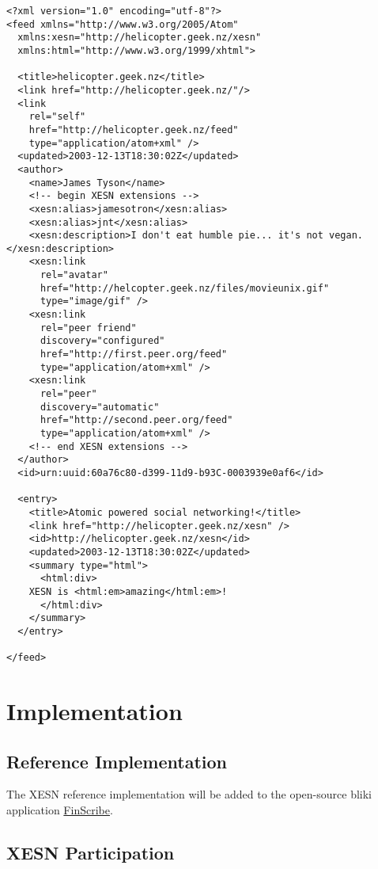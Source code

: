 \documentclass[titlepage,english,a4paper,twoside,dvips]{article}
\begin{document}
\begin{verbatim}
<?xml version="1.0" encoding="utf-8"?>
<feed xmlns="http://www.w3.org/2005/Atom" 
  xmlns:xesn="http://helicopter.geek.nz/xesn"
  xmlns:html="http://www.w3.org/1999/xhtml">

  <title>helicopter.geek.nz</title>
  <link href="http://helicopter.geek.nz/"/>
  <link 
    rel="self" 
    href="http://helicopter.geek.nz/feed" 
    type="application/atom+xml" />
  <updated>2003-12-13T18:30:02Z</updated>
  <author>
    <name>James Tyson</name>
    <!-- begin XESN extensions -->
    <xesn:alias>jamesotron</xesn:alias>
    <xesn:alias>jnt</xesn:alias>
    <xesn:description>I don't eat humble pie... it's not vegan.</xesn:description>
    <xesn:link
      rel="avatar"
      href="http://helcopter.geek.nz/files/movieunix.gif"
      type="image/gif" />
    <xesn:link 
      rel="peer friend"
      discovery="configured"
      href="http://first.peer.org/feed" 
      type="application/atom+xml" />
    <xesn:link 
      rel="peer"
      discovery="automatic"
      href="http://second.peer.org/feed" 
      type="application/atom+xml" />
    <!-- end XESN extensions -->
  </author>
  <id>urn:uuid:60a76c80-d399-11d9-b93C-0003939e0af6</id>

  <entry>
    <title>Atomic powered social networking!</title>
    <link href="http://helicopter.geek.nz/xesn" />
    <id>http://helicopter.geek.nz/xesn</id>
    <updated>2003-12-13T18:30:02Z</updated>
    <summary type="html">
      <html:div>
	XESN is <html:em>amazing</html:em>!
      </html:div>
    </summary>
  </entry>

</feed>
\end{verbatim}

\clearpage

\section{Implementation}

\subsection{Reference Implementation}

The XESN reference implementation will be added to the open-source bliki application \href{http://hww3.riverweb.com/space/pike/FinScribe}{FinScribe}.

\subsection{XESN Participation}
\end{document}
